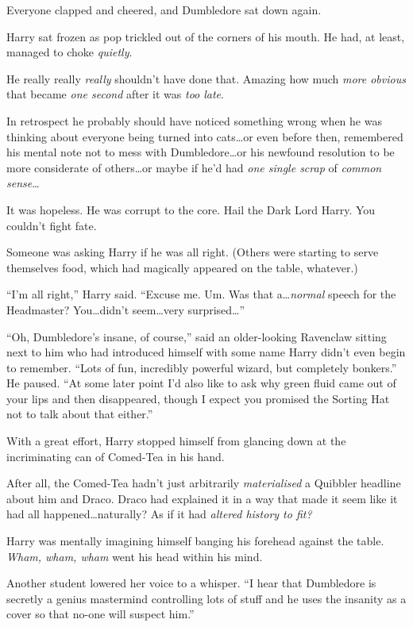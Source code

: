 Everyone clapped and cheered, and Dumbledore sat down again.

Harry sat frozen as pop trickled out of the corners of his mouth. He had, at least, managed to choke \emph{quietly}.

He really really \emph{really} shouldn’t have done that. Amazing how much \emph{more obvious} that became \emph{one second} after it was \emph{too late}.

In retrospect he probably should have noticed something wrong when he was thinking about everyone being turned into cats…or even before then, remembered his mental note not to mess with Dumbledore…or his newfound resolution to be more considerate of others…or maybe if he’d had \emph{one single scrap} of \emph{common sense}…

It was hopeless. He was corrupt to the core. Hail the Dark Lord Harry. You couldn’t fight fate.

Someone was asking Harry if he was all right. (Others were starting to serve themselves food, which had magically appeared on the table, whatever.)

“I’m all right,” Harry said. “Excuse me. Um. Was that a…\emph{normal} speech for the Headmaster? You…didn’t seem…very surprised…”

“Oh, Dumbledore’s insane, of course,” said an older-looking Ravenclaw sitting next to him who had introduced himself with some name Harry didn’t even begin to remember. “Lots of fun, incredibly powerful wizard, but completely bonkers.” He paused. “At some later point I’d also like to ask why green fluid came out of your lips and then disappeared, though I expect you promised the Sorting Hat not to talk about that either.”

With a great effort, Harry stopped himself from glancing down at the incriminating can of Comed-Tea in his hand.

After all, the Comed-Tea hadn’t just arbitrarily \emph{materialised} a Quibbler headline about him and Draco. Draco had explained it in a way that made it seem like it had all happened…naturally? As if it had \emph{altered history to fit?}

Harry was mentally imagining himself banging his forehead against the table. \emph{Wham, wham, wham} went his head within his mind.

Another student lowered her voice to a whisper. “I hear that Dumbledore is secretly a genius mastermind controlling lots of stuff and he uses the insanity as a cover so that no-one will suspect him.”

